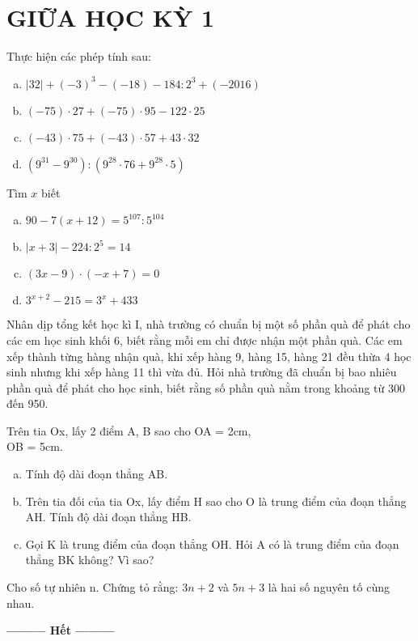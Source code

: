 \section{GIỮA HỌC KỲ 1}
\setcounter{ex}{0}
\begin{ex} Thực hiện các phép tính sau:
	\begin{enumerate}[a)]
	\item $\left| 32 \right|+{{\left( -3 \right)}^{3}}-(-18)-184:{{2}^{3}}+(-2016)$
\item $(-75)\cdot 27+(-75)\cdot 95-122\cdot 25$
\item $(-43)\cdot 75+(-43)\cdot 57+43\cdot 32$
\item $({{9}^{31}}-{{9}^{30}}):({{9}^{28}}\cdot 76+{{9}^{28}}\cdot 5)$

	\end{enumerate}
%
\end{ex}    \begin{ex}  Tìm $x$ biết
	\begin{enumerate}[a)]
	\item $90-7(x+12)={{5}^{107}}:{{5}^{104}}$
\item $\left| x+3 \right|-224:{{2}^{5}}=14$
\item $(3x-9)\cdot (-x+7)=0$
\item ${{3}^{x+2}}-215={{3}^{x}}+433$
	\end{enumerate}
\end{ex}    \begin{ex}  Nhân dịp tổng kết học kì I, nhà trường có chuẩn bị một số phần quà để phát cho các em học sinh khối 6, biết rằng mỗi em chỉ được nhận một phần quà. Các em xếp thành từng hàng nhận quà, khi xếp hàng 9, hàng 15, hàng 21 đều thừa 4 học sinh nhưng khi xếp hàng 11 thì vừa đủ. Hỏi nhà trường đã chuẩn bị bao nhiêu phần quà để phát cho học sinh, biết rằng số phần quà nằm trong khoảng từ 300 đến 950.
\vspace{0,3cm}\\
\end{ex}    \begin{ex}  Trên tia Ox, lấy 2 điểm A, B sao cho OA = 2cm, \\OB = 5cm.
	\begin{enumerate}[a)]
	\item Tính độ dài đoạn thẳng AB.
	\item Trên tia đối của tia Ox, lấy điểm H sao cho O là trung điểm của đoạn thẳng AH. Tính độ dài đoạn thẳng HB.
	\item Gọi K là trung điểm của đoạn thẳng OH. Hỏi A có là trung điểm của đoạn thẳng BK không? Vì sao?
	\end{enumerate}
%
\end{ex}    \begin{ex}  Cho số tự nhiên n. Chứng tỏ rằng: $3n + 2$ và $5n + 3$ là hai số nguyên tố cùng nhau.
\end{ex}

\begin{center}
\textbf{\textbf{---------} Hết \textbf{---------}}
\end{center}
